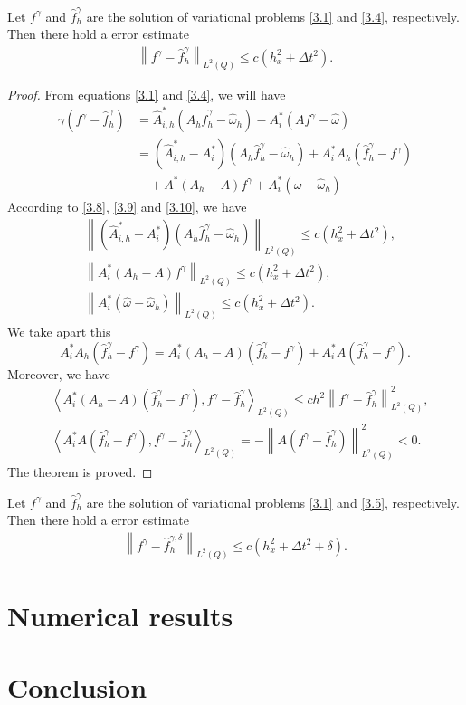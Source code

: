 \documentclass[]{article}
\begin{document}
\begin{dl}\label{dl3.3}
	Let $f^\gamma$ and $\hat{f}^\gamma_h$ are the solution of variational problems \eqref{3.1} and \eqref{3.4}, respectively. Then there hold a error estimate
	\begin{align}\label{3.11}
	\left\|f^\gamma-\hat{f}^\gamma_h \right\|_{L^2(Q)}\leq c(h_x^2+\Delta t^2).
	\end{align}
\end{dl}
\begin{proof} From equations \eqref{3.1} and \eqref{3.4}, we will have
	\begin{align*}
		\gamma \left(f^\gamma-\hat{f}^\gamma_h\right)&=\hat{A}^*_{i, h}\left(A_h\hat{f}^\gamma_h-\hat{\omega}_h\right)-A^*_i\left(Af^\gamma-\hat{\omega}\right)\\
		&=\left(\hat{A}^*_{i, h}-A^*_i\right)\left(A_h\hat{f}^\gamma_h-\hat{\omega}_h\right)+A^*_iA_h\left(\hat{f}^\gamma_h-f^\gamma\right)\\
		&\quad+A^*\left(A_h-A\right)f^\gamma+A^*_i\left(\hat{\omega}-\hat{\omega}_h\right)
	\end{align*}
	According to \eqref{3.8}, \eqref{3.9} and \eqref{3.10}, we have
	\begin{align*}
		&\left\| \left(\hat{A}^*_{i, h}-A^*_i\right)\left(A_h\hat{f}^\gamma_h-\hat{\omega}_h\right)\right\|_{L^2(Q)}\leq c(h_x^2+\Delta t^2),\\
		&\left\| A^*_i\left(A_h-A\right)f^\gamma\right\|_{L^2(Q)}\leq c(h_x^2+\Delta t^2),\\
		&\left\|A^*_i\left(\hat{\omega}-\hat{\omega}_h\right) \right\|_{L^2(Q)}\leq c(h_x^2+\Delta t^2).
	\end{align*}
	We take apart this
	$$A^*_iA_h\left(\hat{f}^\gamma_h-f^\gamma\right)=A^*_i\left(A_h-A\right)\left(\hat{f}^\gamma_h-f^\gamma\right)+A^*_iA\left(\hat{f}^\gamma_h-f^\gamma\right).$$
	Moreover, we have
	\begin{align*}
		&\left\langle A^*_i\left(A_h-A\right)\left(\hat{f}^\gamma_h-f^\gamma\right), f^\gamma-\hat{f}^\gamma_h\right\rangle_{L^2(Q)}\leq ch^2\left\| f^\gamma-\hat{f}^\gamma_h\right\|^2_{L^2(Q)},\\
		&\left\langle A^*_iA\left(\hat{f}^\gamma_h-f^\gamma\right), f^\gamma-\hat{f}^\gamma_h\right\rangle_{L^2(Q)}=-\left\|A\left(f^\gamma-\hat{f}^\gamma_h\right) \right\|^2_{L^2(Q)}<0.
	\end{align*}
	The theorem is proved.
\end{proof}
\begin{cy}\label{cy3.1}
	Let $f^\gamma$ and $\hat{f}^\gamma_h$ are the solution of variational problems \eqref{3.1} and \eqref{3.5}, respectively. Then there hold a error estimate
	\begin{align}\label{3.12}
		\left\|f^\gamma-\hat{f}^{\gamma, \delta}_h \right\|_{L^2(Q)}\leq c(h_x^2+\Delta t^2+\delta).
	\end{align}
\end{cy}


\section{Numerical results}\label{section5}

\section{Conclusion}

\newpage
{}

\end{document}
